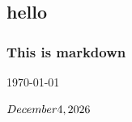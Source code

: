 \hypertarget{hello}{%
\subsection{hello}\label{hello}}

\hypertarget{this-is-markdown}{%
\subsubsection{This is markdown}\label{this-is-markdown}}

\today

\(\today\)
